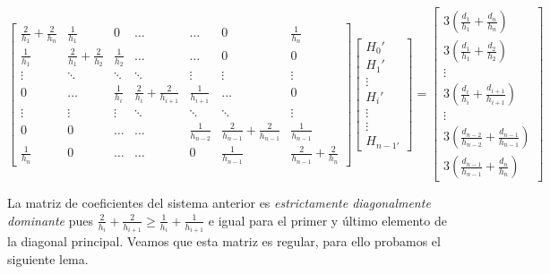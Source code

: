 \documentclass[12pt]{article}
\begin{document}
$$\begin{bmatrix}
	\frac{2}{h_1} + \frac{2}{h_n} & \frac{1}{h_1} & 0 & \dots & \dots & 0 & \frac{1}{h_n} \\
	\frac{1}{h_1} & \frac{2}{h_1} + \frac{2}{h_2} & \frac{1}{h_2} & \dots & \dots & 0 & 0 \\
	\vdots & \ddots & \ddots & \ddots & \vdots & \vdots & \vdots \\
	0 & \dots & \frac{1}{h_i} & \frac{2}{h_i} + \frac{2}{h_{i+1}} & \frac{1}{h_{i+1}} & \dots & 0 \\
	\vdots & \vdots & \vdots & \ddots & \ddots & \ddots & \vdots \\
	0 & 0 & \dots & \dots & \frac{1}{h_{n-2}} &  \frac{2}{h_{n-1}} + \frac{2}{h_{n-1}} & \frac{1}{h_{n-1}} \\
	
	\frac{1}{h_n} & 0 & \dots & \dots & 0 &  \frac{1}{h_{n-1}} & \frac{2}{h_{n-1}} + \frac{2}{h_n}
	
\end{bmatrix} \begin{bmatrix}

H_0' \\ H_1' \\ \vdots  \\ H_i' \\ \vdots \\ \vdots \\ H_{n-1'}
\end{bmatrix} = \begin{bmatrix}
3\left(\frac{d_1}{h_1} + \frac{d_n}{h_n}\right) \\
3 \left(\frac{d_1}{h_1} + \frac{d_2}{h_{2}}\right) \\ \vdots \\ 
3 \left(\frac{d_i}{h_i} + \frac{d_{i+1}}{h_{i+1}}\right) \\ 
\vdots \\ 3\left(\frac{d_{n-2}}{h_{n-2}} + \frac{d_{n-1}}{h_{n-1}}\right) \\ 

3\left(\frac{d_{n-1}}{h_{n-1}} + \frac{d_{n}}{h_{n}}\right)

\end{bmatrix}$$

La matriz de coeficientes del sistema anterior es \textit{estrictamente diagonalmente dominante} pues $\frac{2}{h_i} + \frac{2}{h_{i+1}} \geq \frac{1}{h_i} + \frac{1}{h_{i+1}}$ e igual para el primer y último elemento de la diagonal principal. Veamos que esta matriz es regular, para ello probamos el siguiente lema.
\end{document}
